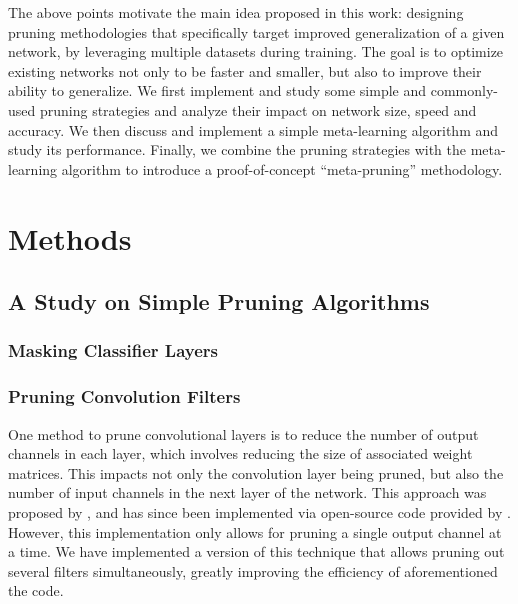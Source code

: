 \documentclass{article}
\begin{document}
The above points motivate the main idea proposed in this work: designing pruning methodologies that specifically target improved generalization of a given network, by leveraging multiple datasets during training. The goal is to optimize existing networks not only to be faster and smaller, but also to improve their ability to generalize. We first implement and study some simple and commonly-used pruning strategies and analyze their impact on network size, speed and accuracy. We then discuss and implement a simple meta-learning algorithm and study its performance. Finally, we combine the pruning strategies with the meta-learning algorithm to introduce a proof-of-concept ``meta-pruning'' methodology.

\section{Methods}

\subsection{A Study on Simple Pruning Algorithms}

\subsubsection{Masking Classifier Layers}


\subsubsection{Pruning Convolution Filters}

One method to prune convolutional layers is to reduce the number of output channels in each layer, which involves reducing the size of associated weight matrices. This impacts not only the convolution layer being pruned, but also the number of input channels in the next layer of the network. This approach was proposed by \cite{prune_transfer_learning}, and has since been implemented via open-source code provided by \cite{jacobgilblog}. However, this implementation only allows for pruning a single output channel at a time. We have implemented a version of this technique that allows pruning out several filters simultaneously, greatly improving the efficiency of aforementioned the code.
\end{document}

